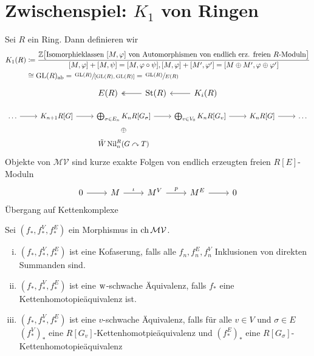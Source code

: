 \section*{Zwischenspiel: $K_1$ von Ringen}
Sei $R$ ein Ring.
Dann definieren wir 
\begin{align}
	K_1(R) &\coloneqq \frac{\mathbb{Z} \benbrace[\big]{\text{Isomorphieklassen $[M,\varphi]$ von Automorphismen von endlich erz. freien $R$-Moduln} }}{[M,\varphi] + [M,\psi] = \benbrace*{M, \varphi \circ \psi}, [M,\varphi] + [M',\varphi'] = \benbrace*{M \oplus M', \varphi \oplus \varphi'}}  \\
	&\cong \GL(R)_{\ab} = \sfrac{\GL(R)}{\benbrace*{\GL(R), \GL(R)}} = \sfrac{\GL(R)}{E(R)}
\end{align}
\[
	\begin{tikzcd}
		E(R) & \operatorname{St}(R) \lar[two heads] & K_i(R) \lar
	\end{tikzcd}
\]


\[
	\begin{tikzcd}
		\ldots \rar & K_{n+1} R[G] \rar & \bigoplus_{\sigma \in  E_n} K_n R[G_\sigma] \rar & \bigoplus_{v \in V_0} K_n R[G_v] \rar & K_n R[G] \rar & \ldots \\
		& & \tilde{W} \Nil_n^R(G \acts T) \uar[phantom,sloped,"\oplus "]
	\end{tikzcd}
\]
Objekte von $\mathcal{MV}$ sind kurze exakte Folgen von endlich erzeugten freien $R[E]$-Moduln
\[
	\begin{tikzcd}
		0 \rar & M \rar["\iota"] & M^V \rar["p"] & M^E \rar & 0
	\end{tikzcd}
\]
Übergang auf Kettenkomplexe

\begin{definition}
	Sei $(f_*,f_*^V,f_*^E)$ ein Morphismus in $\operatorname{ch} \mathcal{MV}$.
	\begin{enumerate}[(i)]
		\item $(f_*,f_*^V,f_*^E)$ ist eine Kofaserung, falls alle $f_n,f_n^E,f_n^V$ Inklusionen von direkten Summanden sind.
		\item $(f_*,f_*^V,f_*^E)$ ist eine $\mkern1mu\mathrm{w}$-schwache Äquivalenz, falls $f_*$ eine Kettenhomotopieäquivalenz ist.
		\item $(f_*,f_*^V,f_*^E)$ ist eine $v$-schwache Äquivalenz, falls für alle $v \in V$ und $\sigma \in  E$ $(f^V_*)_*$ eine $R[G_v]$-Kettenhomotpieäquivalenz und $(f^E_*)_*$ eine $R[G_\sigma]$-Kettenhomotopieäquivalenz
	\end{enumerate}
\end{definition}

